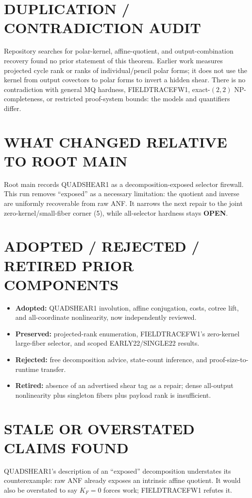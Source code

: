 \documentclass[11pt]{article}
\newcommand{\OPEN}{\textbf{OPEN}}
\begin{document}
\section{DUPLICATION / CONTRADICTION AUDIT}
Repository searches for polar-kernel, affine-quotient, and output-combination
recovery found no prior statement of this theorem.  Earlier work measures
projected cycle rank or ranks of individual/pencil polar forms; it does not
use the kernel from output covectors to polar forms to invert a hidden shear.
There is no contradiction with general MQ hardness, FIELDTRACEFW1,
exact-$(2,2)$ NP-completeness, or restricted proof-system bounds: the models
and quantifiers differ.

\section{WHAT CHANGED RELATIVE TO ROOT MAIN}
Root main records QUADSHEAR1 as a decomposition-exposed selector firewall.
This run removes ``exposed'' as a necessary limitation: the quotient and
inverse are uniformly recoverable from raw ANF.  It narrows the next repair to
the joint zero-kernel/small-fiber corner (5), while all-selector hardness stays
\OPEN{}.

\section{ADOPTED / REJECTED / RETIRED PRIOR COMPONENTS}
\begin{itemize}
\item \textbf{Adopted:} QUADSHEAR1 involution, affine conjugation, costs,
cotree lift, and all-coordinate nonlinearity, now independently reviewed.
\item \textbf{Preserved:} projected-rank enumeration, FIELDTRACEFW1's
zero-kernel large-fiber selector, and scoped EARLY22/SINGLE22 results.
\item \textbf{Rejected:} free decomposition advice, state-count inference,
and proof-size-to-runtime transfer.
\item \textbf{Retired:} absence of an advertised shear tag as a repair; dense
all-output nonlinearity plus singleton fibers plus payload rank is insufficient.
\end{itemize}

\section{STALE OR OVERSTATED CLAIMS FOUND}
QUADSHEAR1's description of an ``exposed'' decomposition understates its
counterexample: raw ANF already exposes an intrinsic affine quotient.  It
would also be overstated to say $K_F=0$ forces work; FIELDTRACEFW1 refutes it.
\end{document}
